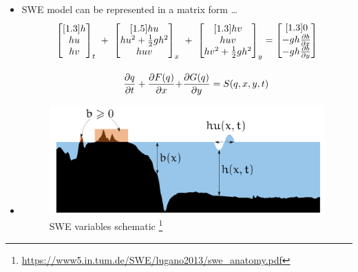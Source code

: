 \begin{frame}
\vspace{-2mm}
\begin{multicols}{2}
\begin{itemize}
\item[] SWE model can be represented in a matrix form \dots
\begin{align*}
\vspace{-15pt}
\begin{bmatrix}[1.3]
h\\
hu\\
hv\\
\end{bmatrix}_t \ + \ 
\begin{bmatrix}[1.5]
hu\\
hu^2 + \frac{1}{2}gh^2\\
huv\\
\end{bmatrix}_x\ &+ \ 
\begin{bmatrix}[1.3]
hv\\
huv\\
hv^2 + \frac{1}{2}gh^2\\
\end{bmatrix}_y = 
\begin{bmatrix}[1.3]
0\\
-gh\frac{\partial b}{\partial x}\\
-gh\frac{\partial b}{\partial y}
\end{bmatrix}\\[1em]
\frac{\partial q}{\partial t} + \dfrac{\partial F(q)}{\partial x} + &\frac{\partial G(q)}{\partial y} = S(q,x,y,t) 
\end{align*}
\item[]
\begin{figure}
\includegraphics[scale=0.2]{./Resources/Images/swe.png}%
\caption{SWE variables schematic \footnote{\url{https://www5.in.tum.de/SWE/lugano2013/swe_anatomy.pdf}}}
\label{fig:swechem}
\end{figure}
\end{itemize}


\end{multicols}
\end{frame}
